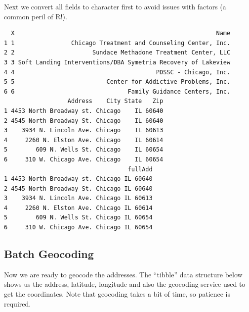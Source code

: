 \documentclass[
  letterpaper,
  DIV=11,
  numbers=noendperiod]{scrreprt}
\newenvironment{Shaded}{\begin{snugshade}}{\end{snugshade}}
\newcommand{\FunctionTok}[1]{\textcolor[rgb]{0.28,0.35,0.67}{#1}}
\newcommand{\NormalTok}[1]{\textcolor[rgb]{0.00,0.23,0.31}{#1}}
\newcommand{\OtherTok}[1]{\textcolor[rgb]{0.00,0.23,0.31}{#1}}
\newcommand{\SpecialCharTok}[1]{\textcolor[rgb]{0.37,0.37,0.37}{#1}}
\begin{document}
Next we convert all fields to character first to avoid issues with
factors (a common peril of R!).

\begin{Shaded}
\end{Shaded}

\begin{verbatim}
  X                                                         Name
1 1                Chicago Treatment and Counseling Center, Inc.
2 2                      Sundace Methadone Treatment Center, LLC
3 3 Soft Landing Interventions/DBA Symetria Recovery of Lakeview
4 4                                        PDSSC - Chicago, Inc.
5 5                          Center for Addictive Problems, Inc.
6 6                                Family Guidance Centers, Inc.
                  Address    City State   Zip
1 4453 North Broadway st. Chicago    IL 60640
2 4545 North Broadway St. Chicago    IL 60640
3    3934 N. Lincoln Ave. Chicago    IL 60613
4     2260 N. Elston Ave. Chicago    IL 60614
5        609 N. Wells St. Chicago    IL 60654
6     310 W. Chicago Ave. Chicago    IL 60654
                                   fullAdd
1 4453 North Broadway st. Chicago IL 60640
2 4545 North Broadway St. Chicago IL 60640
3    3934 N. Lincoln Ave. Chicago IL 60613
4     2260 N. Elston Ave. Chicago IL 60614
5        609 N. Wells St. Chicago IL 60654
6     310 W. Chicago Ave. Chicago IL 60654
\end{verbatim}

\subsection{Batch Geocoding}\label{batch-geocoding}

Now we are ready to geocode the addresses. The ``tibble'' data structure
below shows us the address, latitude, longitude and also the geocoding
service used to get the coordinates. Note that geocoding takes a bit of
time, so patience is required.
\end{document}
